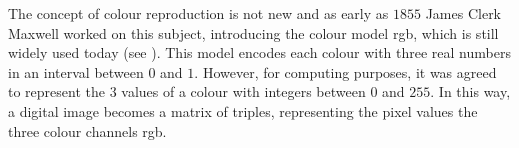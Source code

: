 \begin{toReview}
\noindent The concept of colour reproduction is not new and as early as $1855$ James Clerk Maxwell worked on this subject, introducing the colour model \gls{rgb}, which is still widely used today (see \cite{MaxWell_Colours}). This model encodes each colour with three real numbers in an interval between $0$ and $1$. However, for computing purposes, it was agreed to represent the $3$ values of a colour with integers between $0$ and $255$. In this way, a digital image becomes a matrix of triples, representing the pixel values the three colour channels \gls{rgb}.

\end{toReview}

